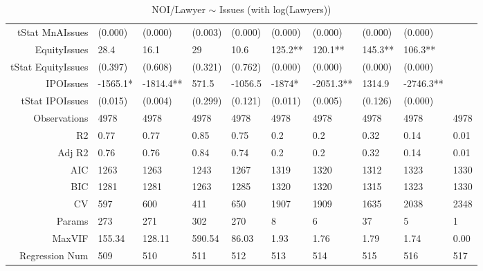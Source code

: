 \begin{table}[ht]
\begin{tabular}{rlllllllll}
  tStat MnAIssues & (0.000) & (0.000) & (0.003) & (0.000) & (0.000) & (0.000) & (0.000) & (0.000) &  \\ 
  EquityIssues & 28.4 & 16.1 & 29 & 10.6 & 125.2** & 120.1** & 145.3** & 106.3** &  \\ 
  tStat EquityIssues & (0.397) & (0.608) & (0.321) & (0.762) & (0.000) & (0.000) & (0.000) & (0.000) &  \\ 
  IPOIssues & -1565.1* & -1814.4** & 571.5 & -1056.5 & -1874* & -2051.3** & 1314.9 & -2746.3** &  \\ 
  tStat IPOIssues & (0.015) & (0.004) & (0.299) & (0.121) & (0.011) & (0.005) & (0.126) & (0.000) &  \\ 
  Observations & 4978 & 4978 & 4978 & 4978 & 4978 & 4978 & 4978 & 4978 & 4978 \\ 
  R2 & 0.77 & 0.77 & 0.85 & 0.75 & 0.2 & 0.2 & 0.32 & 0.14 & 0.01 \\ 
  Adj R2 & 0.76 & 0.76 & 0.84 & 0.74 & 0.2 & 0.2 & 0.32 & 0.14 & 0.01 \\ 
  AIC & 1263 & 1263 & 1243 & 1267 & 1319 & 1320 & 1312 & 1323 & 1330 \\ 
  BIC & 1281 & 1281 & 1263 & 1285 & 1320 & 1320 & 1315 & 1323 & 1330 \\ 
  CV & 597 & 600 & 411 & 650 & 1907 & 1909 & 1635 & 2038 & 2348 \\ 
  Params & 273 & 271 & 302 & 270 & 8 & 6 & 37 & 5 & 1 \\ 
  MaxVIF & 155.34 & 128.11 & 590.54 & 86.03 & 1.93 & 1.76 & 1.79 & 1.74 & 0.00 \\ 
  Regression Num & 509 & 510 & 511 & 512 & 513 & 514 & 515 & 516 & 517 \\ 
   \hline
\end{tabular}
\caption{NOI/Lawyer $\sim$ Issues (with log(Lawyers))} 
\end{table}
